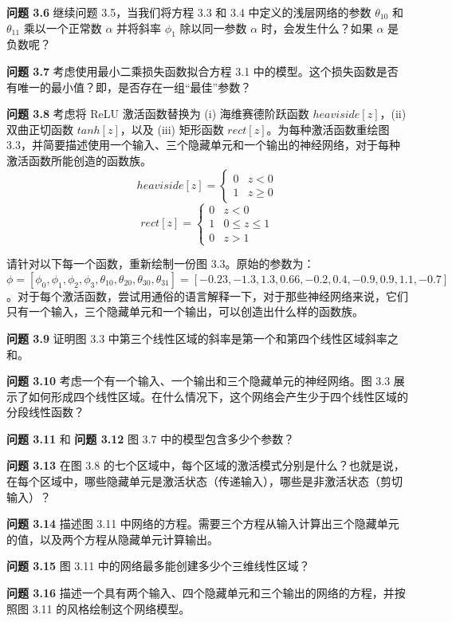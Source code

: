 \textbf{问题 3.6} 继续问题 3.5，当我们将方程 3.3 和 3.4 中定义的浅层网络的参数 \(\theta_{10}\) 和 \(\theta_{11}\) 乘以一个正常数 \(\alpha\) 并将斜率 \(\phi_1\) 除以同一参数 \(\alpha\) 时，会发生什么？如果 \(\alpha\) 是负数呢？

\textbf{问题 3.7} 考虑使用最小二乘损失函数拟合方程 3.1 中的模型。这个损失函数是否有唯一的最小值？即，是否存在一组“最佳”参数？

\textbf{问题 3.8} 考虑将 ReLU 激活函数替换为 (i) 海维赛德阶跃函数 \(heaviside[z]\)，(ii) 双曲正切函数 \(tanh[z]\)，以及 (iii) 矩形函数 \(rect[z]\)。为每种激活函数重绘图 3.3，并简要描述使用一个输入、三个隐藏单元和一个输出的神经网络，对于每种激活函数所能创造的函数族。
\[
heaviside[z] = \begin{cases}
0 & z < 0 \\
1 & z \geq 0
\end{cases}
\]
\[
rect[z] = \begin{cases}
0 & z < 0 \\
1 & 0 \leq z \leq 1 \\
0 & z > 1
\end{cases} \tag{3.15}
\]

请针对以下每一个函数，重新绘制一份图 3.3。原始的参数为：\(\phi = [\phi_0, \phi_1, \phi_2, \phi_3, \theta_{10}, \theta_{20}, 	\theta_{30}, 	\theta_{31}] = [-0.23, -1.3, 1.3, 0.66, -0.2, 0.4, -0.9, 0.9, 1.1, -0.7]\)。对于每个激活函数，尝试用通俗的语言解释一下，对于那些神经网络来说，它们只有一个输入，三个隐藏单元和一个输出，可以创造出什么样的函数族。


\textbf{问题 3.9} 证明图 3.3 中第三个线性区域的斜率是第一个和第四个线性区域斜率之和。

\textbf{问题 3.10} 考虑一个有一个输入、一个输出和三个隐藏单元的神经网络。图 3.3 展示了如何形成四个线性区域。在什么情况下，这个网络会产生少于四个线性区域的分段线性函数？

\textbf{问题 3.11} 和 \textbf{问题 3.12} 图 3.7 中的模型包含多少个参数？

\textbf{问题 3.13} 在图 3.8 的七个区域中，每个区域的激活模式分别是什么？也就是说，在每个区域中，哪些隐藏单元是激活状态（传递输入），哪些是非激活状态（剪切输入）？

\textbf{问题 3.14} 描述图 3.11 中网络的方程。需要三个方程从输入计算出三个隐藏单元的值，以及两个方程从隐藏单元计算输出。

\textbf{问题 3.15} 图 3.11 中的网络最多能创建多少个三维线性区域？

\textbf{问题 3.16} 描述一个具有两个输入、四个隐藏单元和三个输出的网络的方程，并按照图 3.11 的风格绘制这个网络模型。

